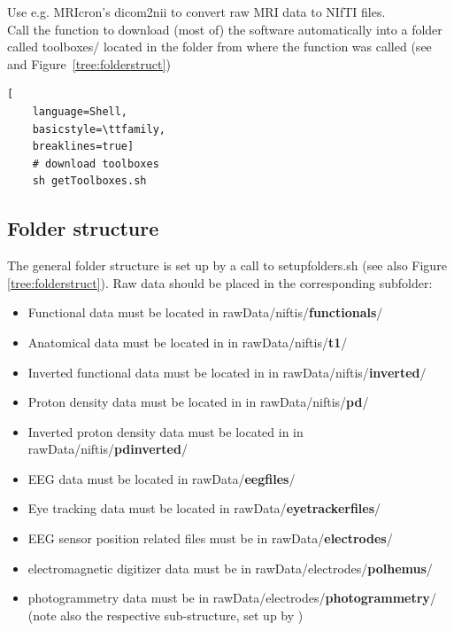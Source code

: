 \documentclass[12pt,a4paper]{scrartcl}
\begin{document}
\noindent Use e.g. MRIcron's dicom2nii to convert raw MRI data to NIfTI files.\\

\noindent Call the function \texttt{} to download (most of) the software automatically into a folder called toolboxes/ located in the folder from where the function was called (see \texttt{} and Figure~\ref{tree:folderstruct})\\
\begin{lstlisting}[
    language=Shell,
    basicstyle=\ttfamily,
    breaklines=true]
    # download toolboxes
    sh getToolboxes.sh
\end{lstlisting}

\subsection{Folder structure}
\label{sec:dirstruct}
The general folder structure is set up by a call to setupfolders.sh (see also Figure \ref{tree:folderstruct}). Raw data should be placed in the corresponding subfolder:
\begin{itemize}
\item Functional data must be located in rawData/niftis/\textbf{functionals}/
\item Anatomical data must be located in in rawData/niftis/\textbf{t1}/
\item Inverted functional data must be located in in rawData/niftis/\textbf{inverted}/
\item Proton density data must be located in in rawData/niftis/\textbf{pd}/
\item Inverted proton density data must be located in in rawData/niftis/\textbf{pdinverted}/
\item EEG data must be located in rawData/\textbf{eegfiles}/
\item Eye tracking data must be located in rawData/\textbf{eyetrackerfiles}/
\item EEG sensor position related files must be in rawData/\textbf{electrodes}/
\item electromagnetic digitizer data must be in rawData/electrodes/\textbf{polhemus}/
\item photogrammetry data must be in rawData/electrodes/\textbf{photogrammetry}/ (note also the respective sub-structure, set up by \texttt{})
\end{itemize}
\end{document}

